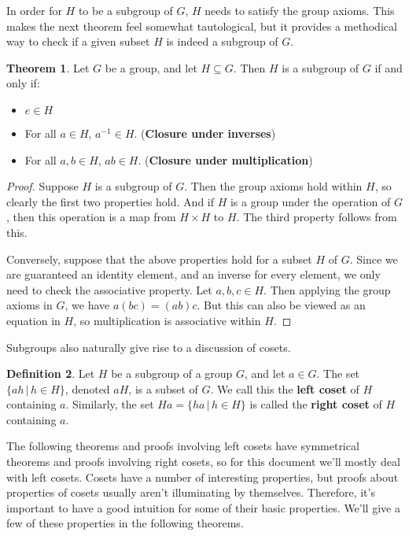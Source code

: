 \documentclass[12pt]{article}
\newcommand{\inv}[1]{#1^{-1}}
\theoremstyle{definition}
\newtheorem{theorem}{Theorem}[section]
\theoremstyle{definition}
\newtheorem{definition}[theorem]{Definition}
\theoremstyle{definition}
\theoremstyle{definition}
\begin{document}
In order for $H$ to be a subgroup of $G$, $H$ needs to satisfy the group axioms. This makes the next theorem feel somewhat tautological, but it provides a methodical way to check if a given subset $H$ is indeed a subgroup of $G$.

\begin{theorem}
Let $G$ be a group, and let $H \subseteq G$. Then $H$ is a subgroup of $G$ if and only if:
\begin{itemize}
    \item $e \in H$
    \item For all $a \in H$, $\inv{a} \in H$. (\textbf{Closure under inverses})
    \item For all $a, b \in H$, $ab \in H$. (\textbf{Closure under multiplication})
\end{itemize}
\end{theorem}

\begin{proof}
Suppose $H$ is a subgroup of $G$. Then the group axioms hold within $H$, so clearly the first two properties hold. And if $H$ is a group under the operation of $G$, then this operation is a map from $H \times H$ to $H$. The third property follows from this.

Conversely, suppose that the above properties hold for a subset $H$ of $G$. Since we are guaranteed an identity element, and an inverse for every element, we only need to check the associative property. Let $a, b, c \in H$. Then applying the group axioms in $G$, we have $a(bc) = (ab)c$. But this can also be viewed as an equation in $H$, so multiplication is associative within $H$.

\end{proof}

Subgroups also naturally give rise to a discussion of cosets.

\begin{definition}
Let $H$ be a subgroup of a group $G$, and let $a \in G$. The set $\{ah \,|\, h \in H\}$, denoted $aH$, is a subset of $G$. We call this the \textbf{left coset} of $H$ containing $a$. Similarly, the set $Ha = \{ha \,|\, h \in H\}$ is called the \textbf{right coset} of $H$ containing $a$.
\end{definition}

The following theorems and proofs involving left cosets have symmetrical theorems and proofs involving right cosets, so for this document we'll mostly deal with left cosets. Cosets have a number of interesting properties, but proofs about properties of cosets usually aren't illuminating by themselves. Therefore, it's important to have a good intuition for some of their basic properties. We'll give a few of these properties in the following theorems.
\end{document}
